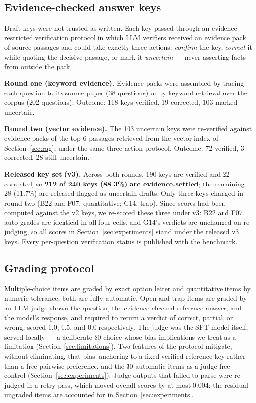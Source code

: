 \documentclass[11pt]{article}
\begin{document}
\subsection{Evidence-checked answer keys}
\label{sec:keys}

Draft keys were not trusted as written. Each key passed through an
evidence-restricted verification protocol in which LLM verifiers received
an evidence pack of source passages and could take exactly three actions:
\emph{confirm} the key, \emph{correct} it while quoting the decisive
passage, or mark it \emph{uncertain} --- never asserting facts from
outside the pack.

\textbf{Round one (keyword evidence).} Evidence packs were assembled by
tracing each question to its source paper (38 questions) or by keyword
retrieval over the corpus (202 questions). Outcome: 118 keys verified,
19 corrected, 103 marked uncertain.

\textbf{Round two (vector evidence).} The 103 uncertain keys were
re-verified against evidence packs of the top-6 passages retrieved from
the vector index of Section~\ref{sec:rag}, under the same three-action
protocol. Outcome:
72 verified, 3 corrected, 28 still uncertain.

\textbf{Released key set (v3).} Across both rounds, 190 keys are verified
and 22 corrected, so \textbf{212 of 240 keys (88.3\%) are
evidence-settled}; the remaining 28 (11.7\%) are released flagged as
uncertain drafts. Only three keys changed in round two (B22 and F07,
quantitative; G14, trap). Since scores had been computed against the v2
keys, we re-scored these three under v3: B22 and F07 auto-grades are
identical in all four cells, and G14's verdicts are unchanged on
re-judging, so all scores in Section~\ref{sec:experiments} stand under
the released v3 keys. Every per-question verification status is
published with the benchmark.

\subsection{Grading protocol}
\label{sec:grading}

Multiple-choice items are graded by exact option letter and quantitative
items by numeric tolerance; both are fully automatic. Open and trap items
are graded by an LLM judge shown the question, the evidence-checked
reference answer, and the model's response, and required to return a
verdict of correct, partial, or wrong, scored 1.0, 0.5, and 0.0
respectively. The judge was the SFT model itself, served locally --- a
deliberate \$0 choice whose bias implications we treat as a limitation
(Section~\ref{sec:limitations}). Two features of the protocol mitigate,
without eliminating, that bias: anchoring to a fixed verified
reference key rather than a free pairwise preference, and the 30
automatic items as a judge-free control
(Section~\ref{sec:experiments}). Judge outputs that failed to parse were
re-judged in a retry pass, which moved overall scores by at most 0.004;
the residual ungraded items are accounted for in
Section~\ref{sec:experiments}.
\end{document}
